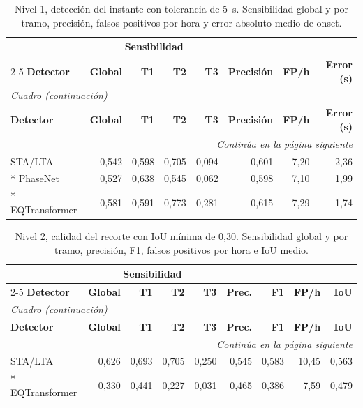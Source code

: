 \documentclass[12pt,oneside,spanish,oldfontcommands]{memoir}
\begin{document}
{\small
\setlength{\tabcolsep}{4pt}
\begin{longtable}{lrrrrrrr}
\caption{Nivel 1, detección del instante con tolerancia de 5~s. Sensibilidad global y por tramo, precisión, falsos positivos por hora y error absoluto medio de onset.}\label{tab:nivel1}\\
\toprule
 & \multicolumn{4}{c}{\textbf{Sensibilidad}} & & & \\
\cmidrule(lr){2-5}
\textbf{Detector} & \textbf{Global} & \textbf{T1} & \textbf{T2} & \textbf{T3} & \textbf{Precisión} & \textbf{FP/h} & \textbf{Error (s)} \\
\midrule
\endfirsthead
\multicolumn{8}{l}{\itshape Cuadro \thetable{} (continuación)}\\
\toprule
\textbf{Detector} & \textbf{Global} & \textbf{T1} & \textbf{T2} & \textbf{T3} & \textbf{Precisión} & \textbf{FP/h} & \textbf{Error (s)} \\
\midrule
\endhead
\midrule
\multicolumn{8}{r}{\itshape Continúa en la página siguiente}\\
\endfoot
\bottomrule
\endlastfoot
STA/LTA & 0,542 & 0,598 & 0,705 & 0,094 & 0,601 & 7,20 & 2,36 \\*
PhaseNet & 0,527 & 0,638 & 0,545 & 0,062 & 0,598 & 7,10 & 1,99 \\*
EQTransformer & 0,581 & 0,591 & 0,773 & 0,281 & 0,615 & 7,29 & 1,74 \\
\end{longtable}
}

{\small
\setlength{\tabcolsep}{4pt}
\begin{longtable}{lrrrrrrrr}
\caption{Nivel 2, calidad del recorte con IoU mínima de 0,30. Sensibilidad global y por tramo, precisión, F1, falsos positivos por hora e IoU medio.}\label{tab:nivel2}\\
\toprule
 & \multicolumn{4}{c}{\textbf{Sensibilidad}} & & & & \\
\cmidrule(lr){2-5}
\textbf{Detector} & \textbf{Global} & \textbf{T1} & \textbf{T2} & \textbf{T3} & \textbf{Prec.} & \textbf{F1} & \textbf{FP/h} & \textbf{IoU} \\
\midrule
\endfirsthead
\multicolumn{9}{l}{\itshape Cuadro \thetable{} (continuación)}\\
\toprule
\textbf{Detector} & \textbf{Global} & \textbf{T1} & \textbf{T2} & \textbf{T3} & \textbf{Prec.} & \textbf{F1} & \textbf{FP/h} & \textbf{IoU} \\
\midrule
\endhead
\midrule
\multicolumn{9}{r}{\itshape Continúa en la página siguiente}\\
\endfoot
\bottomrule
\endlastfoot
STA/LTA & 0,626 & 0,693 & 0,705 & 0,250 & 0,545 & 0,583 & 10,45 & 0,563 \\*
EQTransformer & 0,330 & 0,441 & 0,227 & 0,031 & 0,465 & 0,386 & 7,59 & 0,479 \\
\end{longtable}
}
\end{document}
